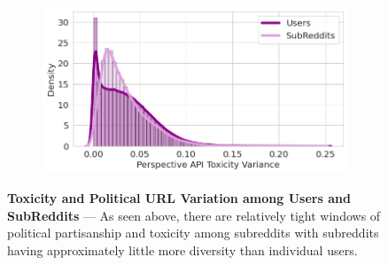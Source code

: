 \begin{figure}
\begin{subfigure}{.48\textwidth}
\label{fig:partisanship-variance}
\end{subfigure}%
\begin{subfigure}{.48\textwidth}
  \centering
  \includegraphics[width=1\linewidth]{figures/toxicity_variance.png}
 
 \label{fig:toxicity-variance}
\end{subfigure}
\caption{\textbf{Toxicity and Political URL Variation among Users and SubReddits }--- As seen above, there are relatively tight windows of political partisanship and toxicity among subreddits with subreddits having approximately little more diversity than individual users. 
}
\label{fig:diversity-of-views}
\end{figure}
